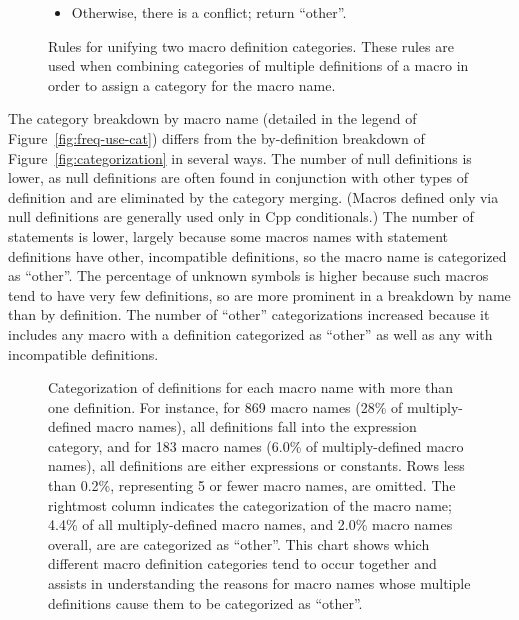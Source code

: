 \documentclass[10pt]{article}
\newcommand{\captionsmall}[1]{\caption[]{\small #1}}
\begin{document}
\begin{figure}
\begin{itemize}
\item Otherwise, there is a conflict; return ``other''.
\end{itemize}


\captionsmall{Rules for unifying two macro definition categories.  These
  rules are used when combining categories of multiple definitions of a
  macro in order to assign a category for the macro name.}
\label{fig:category-lub}
\end{figure}



The category breakdown by macro name (detailed in the legend of
Figure~\ref{fig:freq-use-cat}) differs from the by-definition breakdown of
Figure~\ref{fig:categorization} in several ways.  The number of null
definitions is lower, as null definitions are often found in conjunction
with other types of definition and are eliminated by the category merging.
(Macros defined only via null definitions are generally used only in Cpp
conditionals.)  The number of statements is lower, largely because
some macros names with statement definitions have other, incompatible
definitions, so the macro name is categorized as ``other''.  The percentage
of unknown symbols is higher because such macros tend to have very few
definitions, so are more prominent in a breakdown by name than by
definition.  The number of ``other'' categorizations increased because it
includes any macro with a definition categorized as ``other'' as well as any
with incompatible definitions.


\begin{figure}
  {\small\centerline{}}
  
  \captionsmall{Categorization of definitions for each macro name with more
    than one definition.
    For instance, for 869 macro names (28\% of multiply-defined macro
    names), all definitions fall into the expression category, and for 183
    macro names (6.0\% of multiply-defined macro names), all definitions
    are either expressions or constants.
    Rows less than 0.2\%, representing 5 or fewer macro names, are omitted.
    The rightmost column indicates the categorization of the macro name; 
    4.4\% of all multiply-defined macro names, and 2.0\% macro names
    overall, are are categorized as ``other''.
    This chart shows which different macro definition categories tend
    to occur together and assists in understanding the reasons for macro names
    whose multiple definitions cause them to be categorized as ``other''.}

  \label{fig:subset-categories}
\end{figure}
\end{document}
